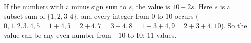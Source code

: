 If the numbers with a minus sign sum to $s$, the value is $10-2s$. Here $s$ is a subset sum of $\{1,2,3,4\}$, and every integer from $0$ to $10$ occurs ($0,1,2,3,4,5=1+4,6=2+4,7=3+4,8=1+3+4,9=2+3+4,10$). So the value can be any even number from $-10$ to $10$: $\boxed{11}$ values.
